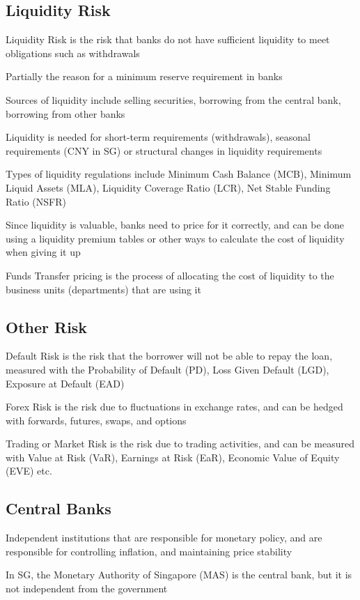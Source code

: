 \subsection{Liquidity Risk}
Liquidity Risk is the risk that banks do not have sufficient liquidity to meet obligations such as withdrawals

Partially the reason for a minimum reserve requirement in banks

Sources of liquidity include selling securities, borrowing from the central bank, borrowing from other banks

Liquidity is needed for short-term requirements (withdrawals), seasonal requirements (CNY in SG) or structural changes in liquidity requirements

Types of liquidity regulations include Minimum Cash Balance (MCB),
Minimum Liquid Assets (MLA), Liquidity Coverage Ratio (LCR), Net Stable Funding Ratio (NSFR)

Since liquidity is valuable, banks need to price for it correctly, and can be done using a liquidity premium tables or other ways to calculate the cost of liquidity when giving it up

Funds Transfer pricing is the process of allocating the cost of liquidity to the business units (departments) that are using it

\subsection{Other Risk}
Default Risk is the risk that the borrower will not be able to repay the loan, measured
with the Probability of Default (PD), Loss Given Default (LGD), Exposure at Default (EAD)

Forex Risk is the risk due to fluctuations in exchange rates, and can be hedged with forwards, futures, swaps, and options

Trading or Market Risk is the risk due to trading activities, and can be measured with Value at Risk (VaR), Earnings at Risk (EaR), Economic Value of Equity (EVE) etc.

\subsection{Central Banks}
Independent institutions that are responsible for monetary policy, and are responsible for controlling inflation, and maintaining price stability

\begin{callout}
    In SG, the Monetary Authority of Singapore (MAS) is the central bank, but it is not independent from the government
\end{callout}

